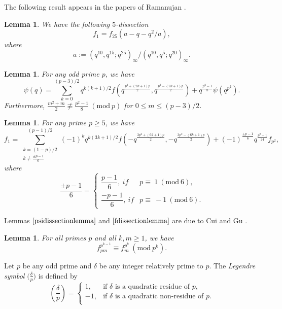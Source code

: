 \documentclass[12pt]{amsart}
\theoremstyle{plain}
\newtheorem{lemma}[theorem]{Lemma}
\theoremstyle{definition}
\begin{document}
The following result appears in the papers of Ramanujan   \cite[p. 212]{RAM}. 
\begin{lemma} \label{lemma2} We have the following $5$-dissection
    \begin{equation}
        f_{1}=f_{25}(a-q-q^{2}/a), \label{lemma2.1}
    \end{equation}
    where 
    $$a:= (q^{10}, q^{15}; q^{25})_{\infty}/(q^{10}, q^{5}; q^{20})_{\infty}.$$
\end{lemma}

\begin{lemma} \label{psidissectionlemma} For any odd prime $p$, we have
\begin{equation}
\psi(q)= \sum_{k=0}^{(p-3)/2} q^{k(k+1)/2} f(q^{\frac{p^{2}+(2k+1)p}{2}}, q^{\frac{p^{2}-(2k+1)p}{2}})+ q^{\frac{p^{2}-1}{8}}\psi(q^{p^{2}}).
 \label{psidissection}
\end{equation}
Furthermore, $\frac{m^{2}+m}{2}\not\equiv\frac{p^{2}-1}{8} \ (\mathrm{mod} \ p)$ for $0 \leq m \leq (p-3)/2$.
\end{lemma}

\begin{lemma} \label{fdissectionlemma} For any prime $p\geq 5$, we have
\begin{equation}
f_{1}= \sum_{\substack{k = (1-p)/2 \\ k\neq \frac{\pm p-1}{6}} }^{(p-1)/2} (-1)^{k} q^{k(3k+1)/2} f(-q^{\frac{3p^{2}+(6k+1)p}{2}}, -q^{\frac{3p^{2}-(6k+1)p}{2}})+(-1)^{\frac{\pm p-1 }{6}} q^{\frac{p^{2}-1}{24}}f_{p^{2}},
 \label{fdissection}
\end{equation}
where 
\[
   	\dfrac{\pm p-1}{6}=
    \begin{cases}
        \dfrac{p-1}{6}, \ if &  p \equiv \ 1 \ (\mathrm{mod} \ 6), \\
      	\dfrac{-p-1}{6}, \ if &  p \equiv \ -1 \ (\mathrm{mod}\ 6).
    \end{cases}
\]
\end{lemma}
Lemmas $\ref{psidissectionlemma}$ and $\ref{fdissectionlemma}$ are due to Cui and Gu \cite[Thm. 2.1 and Thm. 2.2]{r1}.

 \begin{lemma}\label{lemacon}
For all primes $p$ and all $k, m\geq 1$, we have 
\begin{equation}
 f_{pm}^{p^{k-1}} \equiv f_{m}^{p^{k}}  \ (\mathrm{mod} \ p^{k}). \label{binomiallemma} 
\end{equation}
\end{lemma}

Let $p$ be any odd prime and $\delta$ be any integer relatively prime to $p$. The \emph{Legendre symbol} $\bigl( \frac{\delta}{p} \bigl)$ is defined by
\begin{equation*}
        \left( \frac{\delta}{p} \right) = \begin{cases}
                      1,  &\text{if $\delta$ is a quadratic residue of $p$,}\\
                     -1,  &\text{if $\delta$ is a quadratic non-residue of $p$.}\\
                    \end{cases}
\end{equation*}
\end{document}
